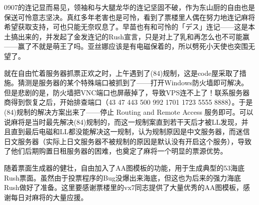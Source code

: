 
0907的连记显而易见，领袖和与大腿龙华的连记坚固不破，作为东山厨的自由也是保送可怜意志坚决。真红多年老害也是可怜，看到了票楼里人偶在努力地连记麻将希望获取支持，可也只能无奈叹息了。早苗也有和可怜的「デス」连记——这是本土搞出来的，并发起了金发连记的Rush宣言，只是对上了乳和再怎么也不可能赢——赢了不就是萌王了吗。亚丝娜应该是有电磁保着的，所以劈死小天使也突围无望了。

就在自由忙着服务器抓票正欢之时，上午遇到了(84)规制，这是code屋采取了措施。猜测是服务器的某个特殊端口被抓到了——打开Windows防火墙即可解决。但是悲剧的是，防火墙把VNC端口也屏蔽掉了，导致VPS连不上了！联系服务器商得到恢复之后，开始排查端口（43 47 443 500 992 1701 1723 5555 8888）。于是(84)规制的解决方案出来了——停止 Routing and Remote Access 服务即可。可以说麻将是当时最先解决(84)规制的，而这一规制案直到若干天后才被LL发现，并且直到最后电磁和LL都没能解决这一规制，认为规制原因是中文服务器，而迷信日文服务器（实际上日文服务器不被规制的原因是默认没有开启这个服务），导致了他们后期购置日租服务器的困难，也奠定了麻将一个明显的票源优势。

随着票面生成器的健壮，自由加入了AA图模板的功能，用于生成典型的53海底Rush票面。虽然由于投票程序的Bug没爆出来海底，但这也为后来的强力海底Rush做好了准备。这里要感谢票楼里的vx7同志提供了大量优秀的AA图模板，感谢每日对麻将的大量应援。

